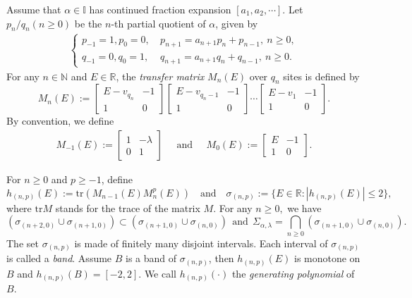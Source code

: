 \documentclass[reqno,11pt,graphicx,]{amsart}
\numberwithin{equation}{section}
\theoremstyle{plain}
\newcommand{\3}{\mathbf{3}}
\begin{document}
	Assume that $\alpha\in \mathbb{I}$ has continued fraction expansion $[a_1,a_2,\cdots]$. Let $p_n/q_n(n\geq0)$ be the $n$-th partial quotient of $\alpha$, given by 
	\begin{align}\label{q-n}
		\begin{cases}
			p_{-1}=1, p_0=0,\  &p_{n+1}=a_{n+1}p_n+p_{n-1},\ n\geq0, \\
			q_{-1}=0, q_0=1,\ &q_{n+1}=a_{n+1}q_n+q_{n-1},\ n\geq0.
		\end{cases}
	\end{align}
	For any $n\in {\mathbb{N}}$ and $E\in\mathbb{R}$, the \textit{%
		transfer matrix} $M_n(E)$ over $q_n$ sites is defined by 
	\begin{equation*}
		M_n(E):= \left[%
		\begin{array}{cc}
			E-v_{q_n} & -1 \\ 
			1 & 0%
		\end{array}%
		\right] \left[%
		\begin{array}{cc}
			E-v_{q_n-1} & -1 \\ 
			1 & 0%
		\end{array}%
		\right] \cdots \left[%
		\begin{array}{cc}
			E-v_1 & -1 \\ 
			1 & 0%
		\end{array}%
		\right].
	\end{equation*}
	By convention, we define 
	\begin{equation*}
		\begin{array}{l}
			M_{-1}(E):= \left[%
			\begin{array}{cc}
				1 & -\lambda \\ 
				0 & 1%
			\end{array}%
			\right]%
		\end{array}
		\ \ \ \text{ and }\ \ \ 
		\begin{array}{l}
			M_{0}(E):= \left[%
			\begin{array}{cc}
				E & -1 \\ 
				1 & 0%
			\end{array}%
			\right].%
		\end{array}%
	\end{equation*}
	
	\indent For $n\ge0$ and $p\ge-1$, define $$h_{(n,p)}(E):=\mathrm{tr} (
	M_{n-1}(E) M_n^p(E))	\ \ \ \text{ and }\ \ \ 
	\sigma_{(n,p)}:=\{E\in\mathbb{R}:|h_{(n,p)}(E)|\leq2\},
	$$
	where $\mathrm{tr}M$ stands for the trace of the matrix $M$. For
	any $n\ge 0,$ we have
	\begin{equation*}
		\left(\sigma_{(n+2,0)}\cup\sigma_{(n+1,0)}\right)\subset
		\left(\sigma_{(n+1,0)}\cup\sigma_{(n,0)}\right)\ \ \text{and}\
		\		\Sigma_{\alpha,\lambda}=\bigcap_{n\ge0}\left(\sigma_{(n+1,0)}
		\cup\sigma_{(n,0)}\right).
	\end{equation*}
	The set $\sigma_{(n,p)}$ is made of finitely many disjoint intervals.
	Each interval of $\sigma_{(n,p)}$ is called a \emph{band}. Assume $%
	B $ is a band of $\sigma_{(n,p)}$, then $h_{(n,p)}(E)$ is
	monotone on $B$ and $h_{(n,p)}(B)=[-2,2].$ We call $%
	h_{(n,p)}(\cdot)$ the \emph{generating polynomial} of $B$.
	
\end{document}
